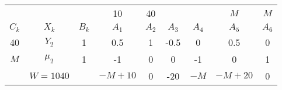     \begin{tabular}{ccccccccc}
    \hline
    \hline
            &         &         & 10      & 40      &         &         & $M$     & $M$ \bigstrut[t]\\
    $C_k$   & $X_k$   & $B_k$   & $A_1$   & $A_2$   & $A_3$   & $A_4$   & $A_5$   & $A_6$ \bigstrut[b]\\
    \hline
    40      & $Y_2$   & 1       & 0.5     & 1       & -0.5    & 0       & 0.5     & 0 \bigstrut[t]\\
    $M$     & $\mu_2$ & 1       & -1      & 0       & 0       & -1      & 0       & 1 \bigstrut[b]\\
    \hline
            & $W=1040$ &         & $-M+10$ & 0       & -20     & $-M$    & $-M+20$ & 0 \bigstrut\\
    \hline
    \hline
    \end{tabular}%
